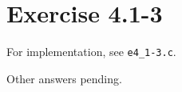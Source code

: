\documentclass{article}
\begin{document}
\section*{Exercise 4.1-3}

For implementation, see \texttt{e4\_1-3.c}.

Other answers pending.
\end{document}
